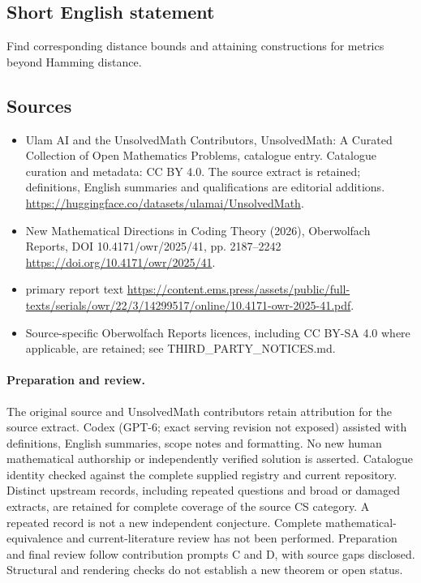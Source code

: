 \documentclass[11pt]{article}
\begin{document}
\subsection{Short English statement}
Find corresponding distance bounds and attaining constructions for metrics beyond Hamming distance.
\subsection{Sources}
\begin{itemize}
\item[\hypertarget{source:statement:1}{S1}] Ulam AI and the UnsolvedMath Contributors, UnsolvedMath: A Curated Collection of Open Mathematics Problems, catalogue entry. Catalogue curation and metadata: CC BY 4.0. The source extract is retained; definitions, English summaries and qualifications are editorial additions.
\url{https://huggingface.co/datasets/ulamai/UnsolvedMath}.
\item[\hypertarget{source:statement:2}{S2}] New Mathematical Directions in Coding Theory (2026), Oberwolfach Reports, DOI 10.4171/owr/2025/41, pp. 2187--2242
\url{https://doi.org/10.4171/owr/2025/41}.
\item[\hypertarget{source:statement:3}{S3}] primary report text
\url{https://content.ems.press/assets/public/full-texts/serials/owr/22/3/14299517/online/10.4171-owr-2025-41.pdf}.
\item Source-specific Oberwolfach Reports licences, including CC BY-SA 4.0 where applicable, are retained; see THIRD\_PARTY\_NOTICES.md.
\end{itemize}
\paragraph{Preparation and review.}
The original source and UnsolvedMath contributors retain attribution for the source extract. Codex (GPT-6; exact serving revision not exposed) assisted with definitions, English summaries, scope notes and formatting. No new human mathematical authorship or independently verified solution is asserted. Catalogue identity checked against the complete supplied registry and current repository. Distinct upstream records, including repeated questions and broad or damaged extracts, are retained for complete coverage of the source CS category. A repeated record is not a new independent conjecture. Complete mathematical-equivalence and current-literature review has not been performed. Preparation and final review follow contribution prompts C and D, with source gaps disclosed. Structural and rendering checks do not establish a new theorem or open status.
\label{end:statement}
\end{document}
